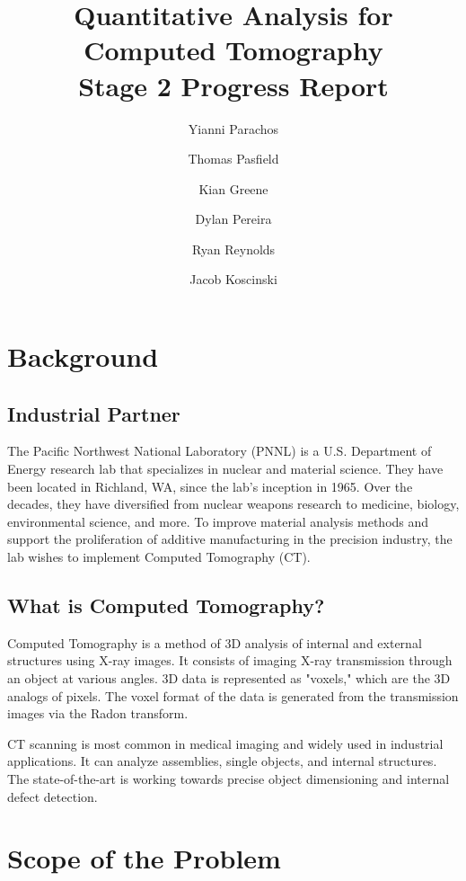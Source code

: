 \documentclass[11pt, letterpaper, notitlepage]{article}
\title{%
  Quantitative Analysis for Computed Tomography\\
  \large \vspace{1em}\textbf{Stage 2 Progress Report}
}
\author{Yianni Parachos}
\author{Thomas Pasfield}
\author{Kian Greene}
\author{Dylan Pereira}
\author{Ryan Reynolds}
\author{Jacob Koscinski}
\affil{Embry-Riddle Aeronautical University, Daytona Beach, FL.}
\affil{\small Industry Representatives: Aaron Luttman\footnote{Pacific Northwest National Laboratory Richland, WA.}\;, Margaret Lund$^*$}
\begin{document}
\maketitle


\begin{multicols}{2}
\section{Background}
  \subsection{Industrial Partner}
    The Pacific Northwest National Laboratory (PNNL) is a U.S. Department of Energy research lab that specializes in nuclear and material science. They have been located in Richland, WA, since the lab's inception in 1965. Over the decades, they have diversified from nuclear weapons research to medicine, biology, environmental science, and more.\cite{noauthor_national_nodate} To improve material analysis methods and support the proliferation of additive manufacturing in the precision industry, the lab wishes to implement Computed Tomography (CT).

  \subsection{What is Computed Tomography?}
    Computed Tomography is a method of 3D analysis of internal and external structures using X-ray images. It consists of imaging X-ray transmission through an object at various angles. 3D data is represented as "voxels," which are the 3D analogs of pixels. The voxel format of the data is generated from the transmission images via the Radon transform.

    CT scanning is most common in medical imaging and widely used in industrial applications. It can analyze assemblies, single objects, and internal structures. The state-of-the-art is working towards precise object dimensioning and internal defect detection.

\section{Scope of the Problem}


\end{multicols}
\end{document}
